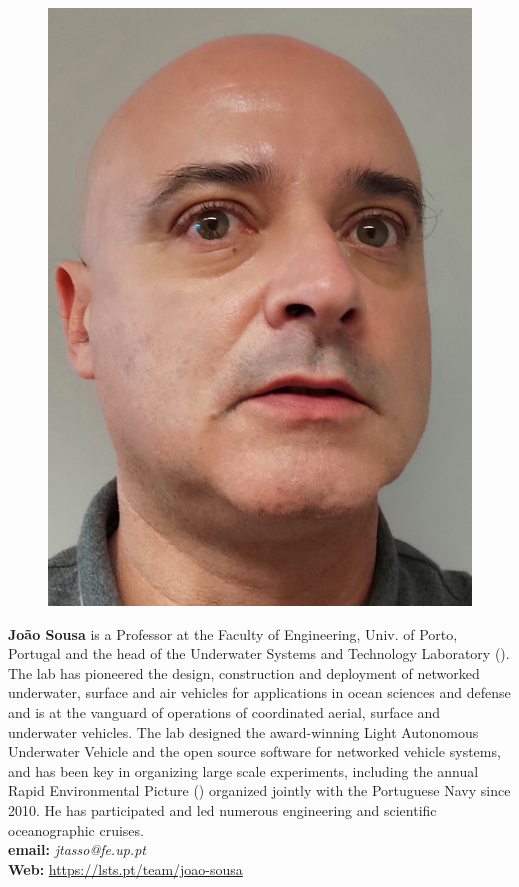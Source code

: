 \vspace*{3cm}
\parbox{5.5in}{
\begin{figure} %
  \vspace{-\intextsep}
\includegraphics[scale=0.06]{fig/JBS.jpg}
\end{figure}
\textbf{Jo\~ao Sousa} is a Professor at the Faculty of Engineering,
Univ. of Porto, Portugal and the head of the Underwater Systems and
Technology Laboratory (\lse). The lab has pioneered the design,
construction and deployment of networked underwater, surface and air
vehicles for applications in ocean sciences and defense and is at the
vanguard of operations of coordinated aerial, surface and underwater
vehicles. The lab designed the award-winning Light Autonomous
Underwater Vehicle and the \ls open source software for networked
vehicle systems, and has been key in organizing large scale
experiments, including the annual Rapid Environmental Picture (\rpe)
organized jointly with the Portuguese Navy since 2010. He has
participated and led numerous engineering and scientific oceanographic
cruises.
\\
\textbf{email: }\emph{jtasso@fe.up.pt}\\
\textbf{Web: }\url{https://lsts.pt/team/joao-sousa}}

